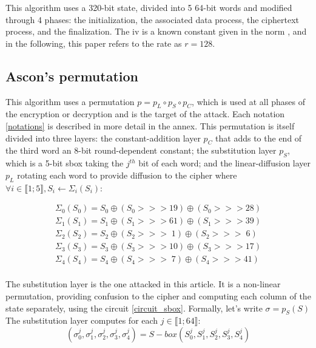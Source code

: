 \documentclass[11pt,technote]{IEEEtran}
\begin{document}
		\begin{algorithm}[h]
		\end{algorithm}
		
		This algorithm uses a 320-bit state, divided into 5 64-bit words and modified through 4 phases: the initialization, the associated data process, the ciphertext process, and the finalization. The \ac{iv} is a known constant given in the norm \cite{norme}, and in the following, this paper refers to the rate as $r=128$.
		
		
		\subsection{Ascon's permutation}	\label{perm}	
		This algorithm uses a permutation $p = p_L \circ p_S \circ p_C$, which is used at all phases of the encryption or decryption and is the target of the attack. Each notation \ref{notations} is described in more detail in the annex. This permutation is itself divided into three layers: the constant-addition layer $p_C$ that adds to the end of the third word an 8-bit round-dependent constant; the substitution layer $p_S$, which is a 5-bit \ac{sbox} taking the $j^{th}$ bit of each word; and the linear-diffusion layer $p_L$ rotating each word to provide diffusion to the cipher where $\forall i \in \llbracket 1;5 \rrbracket, S_i \leftarrow \Sigma_i(S_i)$:
		
		\begin{gather*}
			\Sigma_0(S_0) = S_0 \oplus (S_0 >>> 19) \oplus (S_0 >>> 28)\\
			\Sigma_1(S_1) = S_1 \oplus (S_1 >>> 61) \oplus (S_1 >>> 39)\\
			\Sigma_2(S_2) = S_2 \oplus (S_2 >>> \;  1) \oplus (S_2 >>> \; 6)\\
			\Sigma_3(S_3) = S_3 \oplus (S_3 >>> 10) \oplus (S_3 >>> 17)\\
			\Sigma_4(S_4) = S_4 \oplus (S_4 >>> \; 7) \oplus (S_4 >>> 41)\\
		\end{gather*}
		
		The substitution layer is the one attacked in this article. It is a non-linear permutation, providing confusion to the cipher and computing each column of the state separately, using the circuit \ref{circuit_sbox}. Formally, let's write $\sigma=p_S(S)$\\
		The substitution layer computes for each $j \in \llbracket 1;64 \rrbracket$:
		$$(\sigma_0^j,\sigma_1^j,\sigma_2^j,\sigma_3^j,\sigma_4^j) = S-box(S_0^j,S_1^j,S_2^j,S_3^j,S_4^j)$$
		
\end{document}
